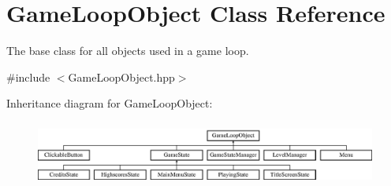 \hypertarget{class_game_loop_object}{}\section{Game\+Loop\+Object Class Reference}
\label{class_game_loop_object}


The base class for all objects used in a game loop.  




{\ttfamily \#include $<$Game\+Loop\+Object.\+hpp$>$}

Inheritance diagram for Game\+Loop\+Object\+:\begin{figure}[H]
\begin{center}
\leavevmode
\includegraphics[height=2.137405cm]{class_game_loop_object}
\end{center}
\end{figure}
